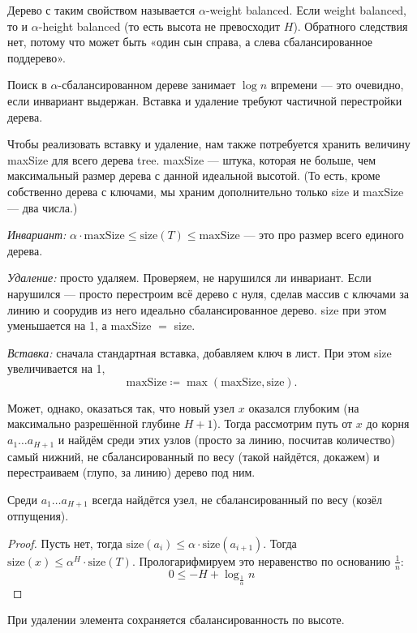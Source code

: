 \documentclass[a4paper,11pt]{article}
\begin{document}
Дерево с таким свойством называется $\alpha$-weight balanced. Если weight balanced, то и $\alpha$-height balanced (то есть высота не превосходит $H$). Обратного следствия нет, потому что может быть «один сын справа, а слева сбалансированное поддерево».

Поиск в $\alpha$-сбалансированном дереве занимает $\log n$ впремени — это очевидно, если инвариант выдержан. Вставка и удаление требуют частичной перестройки дерева.

Чтобы реализовать вставку и удаление, нам также потребуется хранить величину maxSize для всего дерева tree. maxSize — штука, которая не больше, чем максимальный размер дерева с данной идеальной высотой. (То есть, кроме собственно дерева с ключами, мы храним дополнительно только size и maxSize — два числа.)

{\it Инвариант:} $\alpha \cdot \text{maxSize} \le \text{size} (T) \le \text{maxSize}$ — это про размер всего единого дерева.

{\it Удаление:} просто удаляем. Проверяем, не нарушился ли инвариант. Если нарушился — просто перестроим всё дерево с нуля, сделав массив с ключами за линию и соорудив из него идеально сбалансированное дерево. size при этом уменьшается на 1, а maxSize $=$ size.

{\it Вставка:} сначала стандартная вставка, добавляем ключ в лист. При этом size увеличивается на 1,
	$$\text{maxSize} \coloneqq \max (\text{maxSize},\text{size}).$$

Может, однако, оказаться так, что новый узел $x$ оказался глубоким (на максимально разрешённой глубине $H+1$). Тогда рассмотрим путь от $x$ до корня $a_1 \ldots a_{H+1}$ и найдём среди этих узлов (просто за линию, посчитав количество) самый нижний, не сбалансированный по весу (такой найдётся, докажем) и перестраиваем (глупо, за линию) дерево под ним.

\begin{theorem}
	Среди $a_1 \ldots a_{H+1}$ всегда найдётся узел, не сбалансированный по весу (козёл отпущения).
\end{theorem}

\begin{proof}
	Пусть нет, тогда $\text{size} (a_i) \le \alpha \cdot \text{size} (a_{i+1})$. Тогда $\text{size} (x) \le \alpha^H \cdot \text{size} (T)$. Прологарифмируем это неравенство по основанию $\frac{1}{n}$:
	$$0 \le -H + \log_{\frac{1}{\alpha}} n$$
\end{proof}

\begin{theorem} При удалении элемента сохраняется сбалансированность по высоте. \end{theorem}



\end{document}
